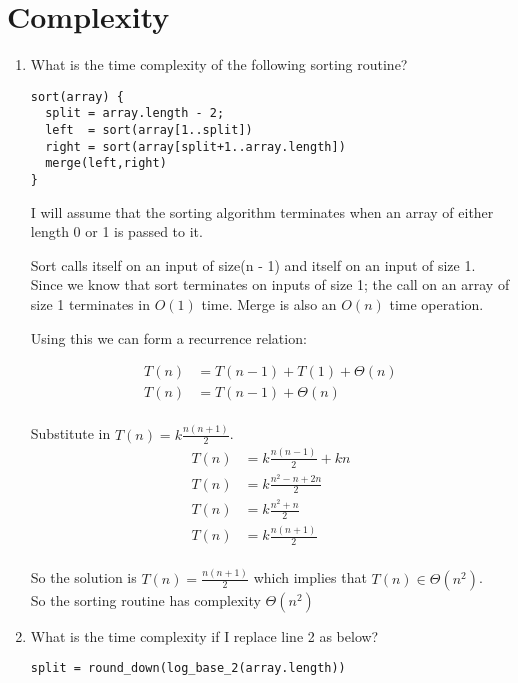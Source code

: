 \documentclass[10pt,\jkfside,a4paper]{article}
\begin{document}
\section{Complexity}

\begin{enumerate}

\item What is the time complexity of the following sorting routine?

\begin{lstlisting}
sort(array) {
  split = array.length - 2;
  left  = sort(array[1..split])
  right = sort(array[split+1..array.length])
  merge(left,right)
}
\end{lstlisting}

I will assume that the sorting algorithm terminates when an array of either length 
0 or 1 is passed to it.

Sort calls itself on an input of size(n - 1) and itself on an input of size 1.
Since we know that sort terminates on inputs of size 1; the call on an array 
of size 1 terminates in $O(1)$ time. Merge is also an $O(n)$ time operation.

Using this we can form a recurrence relation:

\begin{equation}\label{simplerecurrence}
\begin{split}
T(n) &= T(n - 1) + T(1) + \Theta(n) \\
T(n) &= T(n - 1) + \Theta(n) \\
\end{split}
\end{equation}

Substitute in $T(n) = k\frac{n(n + 1)}{2}$.
\begin{equation}
\begin{split}
T(n) &= k\frac{n(n - 1)}{2} + kn \\
T(n) &= k\frac{n^2 - n + 2n}{2} \\
T(n) &= k\frac{n^2 + n}{2} \\
T(n) &= k\frac{n(n + 1)}{2} \\
\end{split}
\end{equation}

So the solution is $T(n) = \frac{n(n + 1)}{2}$ which implies that $T(n) \in \Theta(n^2)$.\\
So the sorting routine has complexity $\Theta(n^2)$

\item What is the time complexity if I replace line 2 as below?
\begin{lstlisting}
split = round_down(log_base_2(array.length))
\end{lstlisting}


\end{enumerate}
\end{document}
